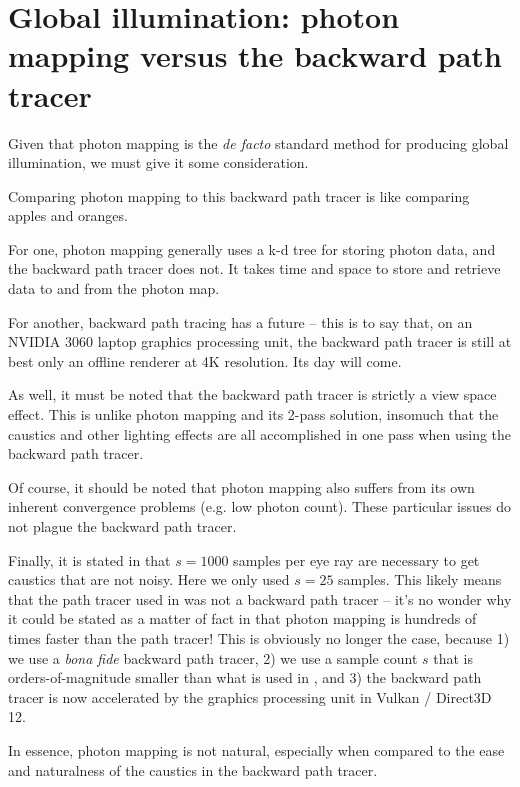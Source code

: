 \documentclass[12pt]{article}
\begin{document}
\section{Global illumination: photon mapping versus the backward path tracer}

Given that photon mapping \cite{jensen, john} is the \textit{de facto}	standard method for producing global illumination, we must give it some consideration.

Comparing photon mapping to this backward path tracer is like comparing apples and oranges.

For one, photon mapping generally uses a k-d tree for storing photon data, and the backward path tracer does not.
It takes time and space to store and retrieve data to and from the photon map.

For another, backward path tracing has a future -- this is to say that, on an NVIDIA 3060 laptop graphics processing unit, the backward path tracer is still at best only an offline renderer at 4K resolution.
Its day will come.

As well, it must be noted that the backward path tracer is strictly a view space effect.
This is unlike photon mapping and its 2-pass solution, insomuch that the caustics and other lighting effects are all accomplished in one pass when using the backward path tracer.

Of course, it should be noted that photon mapping also suffers from its own inherent convergence problems (e.g. low photon count).
These particular issues do not plague the backward path tracer.

Finally, it is stated in \cite{jensen} that $s = 1000$ samples per eye ray are necessary to get caustics that are not noisy.
Here we only used $s = 25$ samples.
This likely means that the path tracer used in \cite{jensen} was not a backward path tracer -- it's no wonder why it could be stated as a matter of fact in \cite{jensen} that photon mapping is hundreds of times faster than the path tracer!
This is obviously no longer the case, because 1) we use a {\textit{bona fide}} backward path tracer, 2) we use a sample count $s$ that is orders-of-magnitude smaller than what is used in \cite{jensen}, and 3) the backward path tracer is now accelerated by the graphics processing unit in Vulkan / Direct3D 12.

In essence, photon mapping is not natural, especially when compared to the ease and naturalness of the caustics in the backward path tracer.
\end{document}
